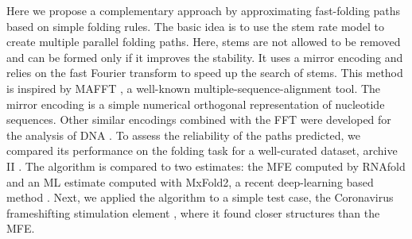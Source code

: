 \documentclass[a4paper,12pt]{article}
\begin{document}
Here we propose a complementary approach by approximating fast-folding paths
based on simple folding rules. The basic idea is to use the stem rate model to
create multiple parallel folding paths. Here, stems are not allowed to be
removed and can be formed only if it improves the stability. It uses a mirror
encoding and relies on the fast Fourier transform to speed up the search of
stems. This method is inspired by MAFFT \cite{katoh02_mafft}, a well-known
multiple-sequence-alignment tool. The mirror encoding is a simple numerical
orthogonal representation of nucleotide sequences. Other similar encodings
combined with the FFT were developed for the analysis of DNA
\cite{felsenstein82_effic_method_match_nucleic_acid_sequen}. To assess the
reliability of the paths predicted, we compared its performance on the folding
task for a well-curated dataset, archive II
\cite{mathews19_how_to_bench_rna_secon}. The algorithm is compared to two
estimates: the MFE computed by RNAfold and an ML estimate computed with MxFold2,
a recent deep-learning based method \cite{sato20_rna}. Next, we applied the
algorithm to a simple test case, the Coronavirus frameshifting stimulation
element \cite{baranov05_progr_ribos_frames_decod_sars_cov_genom}, where it
found closer structures than the MFE.
\end{document}
